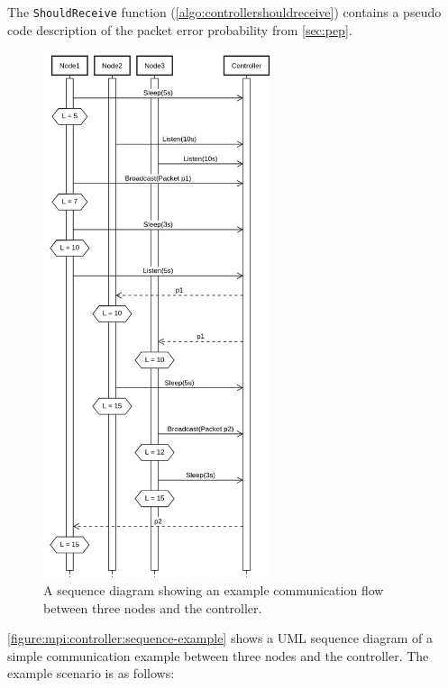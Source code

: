 The \texttt{ShouldReceive} function (\autoref{algo:controllershouldreceive}) contains a pseudo code description of the packet error probability from \autoref{sec:pep}. \medbreak

\begin{figure}[H]
    \centering
    \includegraphics[width=0.6\textwidth]{figures/controller_sequence.png}
    \caption{A sequence diagram showing an example communication flow between three nodes and the controller.}
    \label{figure:mpi:controller:sequence-example}
\end{figure}

\autoref{figure:mpi:controller:sequence-example} shows a UML sequence diagram of a simple communication example between three nodes and the controller. The example scenario is as follows:



